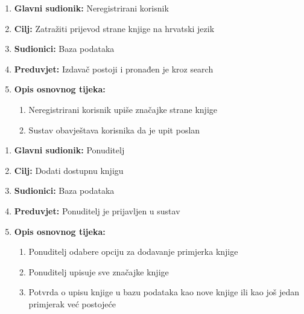 \noindent {}
\begin{enumerate}
	
	\item \textbf{Glavni sudionik: } Neregistrirani korisnik
	\item  \textbf{Cilj:} Zatražiti prijevod strane knjige na hrvatski jezik
	\item  \textbf{Sudionici:} Baza podataka
	\item  \textbf{Preduvjet:} Izdavač postoji i pronađen je kroz search
	\item  \textbf{Opis osnovnog tijeka:}
	
	\begin{enumerate}
	 
		\item Neregistrirani korisnik upiše značajke strane knjige
		\item Sustav obavještava korisnika da je upit poslan
		
	\end{enumerate}
	
\end{enumerate}

\noindent {}
\begin{enumerate}
	
	\item \textbf{Glavni sudionik: } Ponuditelj
	\item  \textbf{Cilj:} Dodati dostupnu knjigu 
	\item  \textbf{Sudionici:} Baza podataka
	\item  \textbf{Preduvjet:} Ponuditelj je prijavljen u sustav
	\item  \textbf{Opis osnovnog tijeka:}
	
	\begin{enumerate}
		
		\item Ponuditelj odabere opciju za dodavanje primjerka knjige
		\item Ponuditelj upisuje sve značajke knjige   
		\item Potvrda o upisu knjige u bazu podataka kao nove knjige ili kao još jedan primjerak već postojeće
		
	\end{enumerate}
	
\end{enumerate}

